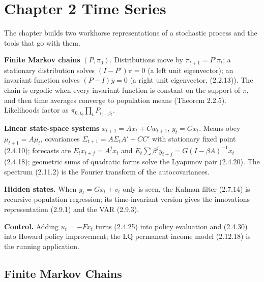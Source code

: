 \documentclass[12pt, letterpaper]{article}
\newcommand{\yb}{\overline{y}}
\begin{document}
\section{Chapter 2 \quad Time Series}

\begin{tcolorbox}[theorybox,title={Chapter 2 Overview}]
The chapter builds two workhorse representations of a stochastic process and the tools that go
with them.

\smallskip
\textbf{Finite Markov chains} $(P,\pi_0)$. Distributions move by $\pi_{t+1}=P'\pi_t$; a stationary
distribution solves $(I-P')\pi=0$ (a left unit eigenvector); an invariant function solves
$(P-I)\yb=0$ (a right unit eigenvector, (2.2.13)). The chain is ergodic when every invariant
function is constant on the support of $\pi$, and then time averages converge to population
means (Theorem 2.2.5). Likelihoods factor as $\pi_{0,i_0}\prod_t P_{i_{t-1}i_t}$.

\smallskip
\textbf{Linear state-space systems} $x_{t+1}=Ax_t+Cw_{t+1}$, $y_t=Gx_t$. Means obey $\mu_{t+1}=A\mu_t$,
covariances $\Sigma_{t+1}=A\Sigma_tA'+CC'$ with stationary fixed point (2.4.10); forecasts are
$E_tx_{t+j}=A^jx_t$ and $E_t\sum\beta^jy_{t+j}=G(I-\beta A)^{-1}x_t$ (2.4.18); geometric sums of
quadratic forms solve the Lyapunov pair (2.4.20). The spectrum (2.11.2) is the Fourier transform of
the autocovariances.

\smallskip
\textbf{Hidden states.} When $y_t=Gx_t+v_t$ only is seen, the Kalman filter (2.7.14) is recursive
population regression; its time-invariant version gives the innovations representation (2.9.1) and
the VAR (2.9.3).

\smallskip
\textbf{Control.} Adding $u_t=-Fx_t$ turns (2.4.25) into policy evaluation and (2.4.30) into Howard
policy improvement; the LQ permanent income model (2.12.18) is the running application.
\end{tcolorbox}

\subsection{Finite Markov Chains}
\end{document}
